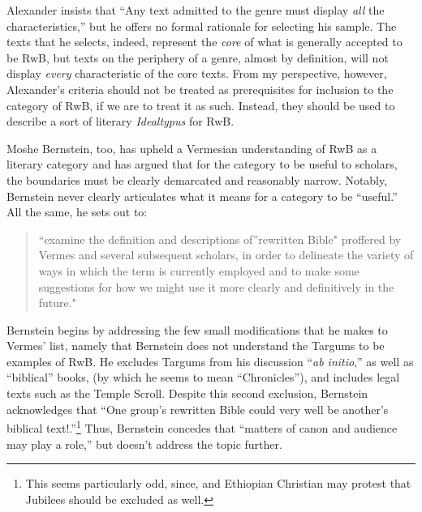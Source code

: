 Alexander insists that ``Any text admitted to the genre must display
\emph{all} the characteristics,''\autocite[119 n.
11]{alexander_carson-williamson1988} but he offers no formal rationale
for selecting his sample. The texts that he selects, indeed, represent
the \emph{core} of what is generally accepted to be RwB, but texts on
the periphery of a genre, almost by definition, will not display
\emph{every} characteristic of the core texts. From my perspective,
however, Alexander's criteria should not be treated as prerequisites for
inclusion to the category of RwB, if we are to treat it as such.
Instead, they should be used to describe a sort of literary
\emph{Idealtypus} for RwB.

Moshe Bernstein, too, has upheld a Vermesian understanding of RwB as a
literary category and has argued that for the category to be useful to
scholars, the boundaries must be clearly demarcated and reasonably
narrow.\autocite{bernstein_textus2005} Notably, Bernstein never clearly
articulates what it means for a category to be ``useful.'' All the same,
he sets out to:

\begin{quote}
``examine the definition and descriptions of''rewritten Bible" proffered
by Vermes and several subsequent scholars, in order to delineate the
variety of ways in which the term is currently employed and to make some
suggestions for how we might use it more clearly and definitively in the
future." \autocite[171--172]{bernstein_textus2005}
\end{quote}

Bernstein begins by addressing the few small modifications that he makes
to Vermes' list, namely that Bernstein does not understand the Targums
to be examples of RwB. He excludes Targums from his discussion
``\emph{ab initio},'' as well as ``biblical'' books, (by which he seems
to mean ``Chronicles''), and includes legal texts such as the
Temple Scroll. Despite this second exclusion, Bernstein acknowledges
that ``One group's rewritten Bible could very well be another's biblical
text!.''\footnote{\textcite[175]{bernstein_textus2005} This seems
  particularly odd, since, and Ethiopian Christian may protest that
  Jubilees should be excluded as well.} Thus, Bernstein concedes that
``matters of canon and audience may play a role,'' but doesn't address
the topic further.

